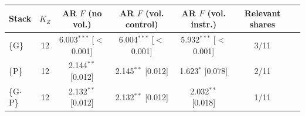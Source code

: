 \begin{tabular}{@{}lcccccc@{}}
\toprule
Stack & $K_Z$ & AR $F$ (no vol.) & AR $F$ (vol. control) & AR $F$ (vol. instr.) & Relevant shares \\
\midrule
\{G\} & 12 & 6.003$^{***}$ [$<$0.001] & 6.004$^{***}$ [$<$0.001] & 5.932$^{***}$ [$<$0.001] & 3/11 \\
\{P\} & 12 & 2.144$^{**}$ [0.012] & 2.145$^{**}$ [0.012] & 1.623$^{*}$ [0.078] & 2/11 \\
\{G$\cdot$P\} & 12 & 2.132$^{**}$ [0.012] & 2.132$^{**}$ [0.012] & 2.032$^{**}$ [0.018] & 1/11 \\
\bottomrule
\end{tabular}
